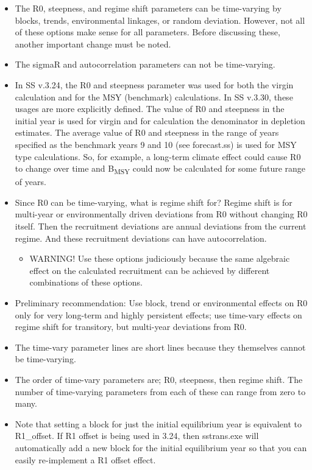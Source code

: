 \begin{itemize}
	\item 	The R0, steepness, and regime shift parameters can be time-varying by blocks, trends, environmental linkages, or random deviation.  However, not all of these options make sense for all parameters.  Before discussing these, another important change must be noted.
	
	\item The sigmaR and autocorrelation parameters can not be time-varying. 
	
	\item In SS v.3.24, the R0 and steepness parameter was used for both the virgin calculation and for the MSY (benchmark) calculations.  In SS v.3.30, these usages are more explicitly defined.  The value of R0 and steepness in the initial year is used for virgin and for calculation the denominator in depletion estimates.  The average value of R0 and steepness in the range of years specified as the benchmark years 9 and 10 (see forecast.ss) is used for MSY type calculations.  So, for example, a long-term climate effect could cause R0 to change over time and B\textsubscript{MSY} could now be calculated for some future range of years.
	
	\item Since R0 can be time-varying, what is regime shift for?  Regime shift is for multi-year or environmentally driven deviations from R0 without changing R0 itself.  Then the recruitment deviations are annual deviations from the current regime.  And these recruitment deviations can have autocorrelation.
	
	\begin{itemize}
		\item WARNING!  Use these options judiciously because the same algebraic effect on the calculated recruitment can be achieved by different combinations of these options.
	\end{itemize}
	
	\item Preliminary recommendation:  Use block, trend or environmental effects on R0 only for very long-term and highly persistent effects; use time-vary effects on regime shift for transitory, but multi-year deviations from R0.
	
	\item The time-vary parameter lines are short lines because they themselves cannot be time-varying.
	
	\item The order of time-vary parameters are; R0,  steepness, then regime shift.  The number of time-varying parameters from each of these can range from zero to many. \item Note that setting a block for just the initial equilibrium year is equivalent to R1\_offset.  If R1 offset is being used in 3.24, then sstrans.exe will automatically add a new block for the initial equilibrium year so that you can easily re-implement a R1 offset effect.
\end{itemize}


